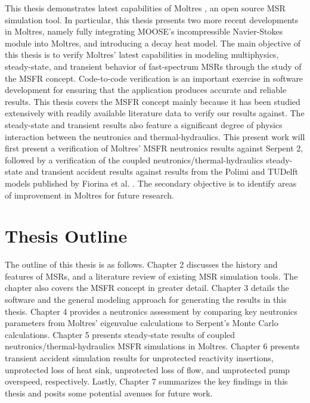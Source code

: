 This thesis demonstrates latest capabilities of Moltres
\cite{lindsay_introduction_2018}, an open source MSR simulation tool.
In particular, this thesis presents two more recent
developments in Moltres, namely fully integrating \gls{MOOSE}'s incompressible
Navier-Stokes module into Moltres, and introducing a
decay heat model.
The main objective of this thesis is to verify Moltres'
latest capabilities in modeling multiphysics, steady-state, and transient
behavior of fast-spectrum \glspl{MSR} through the study of the \gls{MSFR}
concept. Code-to-code verification is an important exercise in software
development for ensuring that the application produces accurate and reliable
results. This thesis covers the \gls{MSFR} concept mainly because it has been
studied extensively with readily available literature data to verify our
results against. The
steady-state and transient results also feature a significant degree of
physics interaction between the neutronics and thermal-hydraulics. This
present work will first present a verification of Moltres' \gls{MSFR}
neutronics results against Serpent 2, followed by a verification of
the coupled neutronics/thermal-hydraulics steady-state and transient accident
results against results from the Polimi and TUDelft models published by
Fiorina et al. \cite{fiorina_modelling_2014}. The
secondary objective is to identify areas of improvement in Moltres for future
research.

\section{Thesis Outline}

The outline of this thesis is as follows. Chapter 2 discusses the history and
features of \glspl{MSR}, and a literature review of existing \gls{MSR}
simulation tools. The chapter also covers the \gls{MSFR} concept in greater
detail. Chapter 3 details the software and the general modeling
approach for generating the results in this thesis. Chapter 4 provides a
neutronics assessment by comparing key neutronics parameters from Moltres'
eigenvalue calculations to Serpent's Monte Carlo calculations. Chapter 5
presents steady-state results of coupled neutronics/thermal-hydraulics
\gls{MSFR} simulations in Moltres. Chapter 6 presents transient accident
simulation results for unprotected reactivity insertions, unprotected loss of
heat sink, unprotected loss of flow, and unprotected pump overspeed,
respectively. Lastly, Chapter 7 summarizes the key findings in this thesis
and posits some potential avenues for future work.
